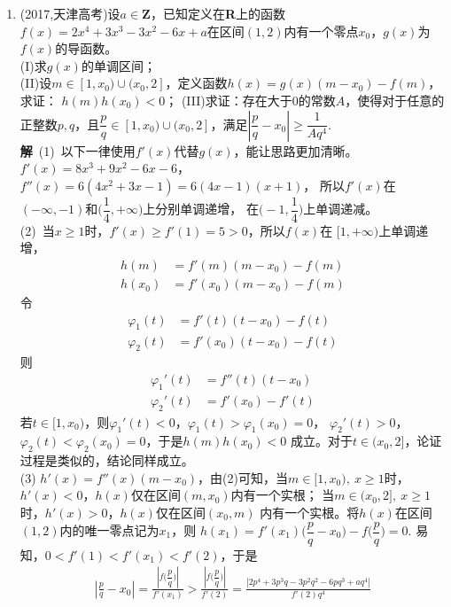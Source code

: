 \begin{enumerate}[label={【\textbf{例\thechapter.\arabic*}】},
 leftmargin=\inteval{\myenumleftmargin}pt,
 itemsep=\inteval{\myenumitempsep}pt,
 itemindent=\inteval{\myenumitemindent}pt]
\item (2017,天津高考)设$ a\in \textbf{Z} $，已知定义在\textbf{R}上的函数$ f(x)=2x^4+3x^3
-3x^2-6x+a $在区间$ (1,2) $内有一个零点$ x_0 $，$ g(x) $为$ f(x) $的导函数。\\
(I)求$ g(x) $的单调区间；\\
(II)设$ m\in [1,x_0)\cup(x_0,2] $，定义函数$ h(x)=g(x)(m-x_0)-f(m) $，求证：
$ h(m)h(x_0)<0 $；
(III)求证：存在大于0的常数$ A $，使得对于任意的正整数$ p,q $，且$ \dfrac{p}{q}\in[1,
x_0)\cup(x_0,2] $，满足$ \left|\dfrac{p}{q}-x_0\right|\geq 
 \dfrac{1}{Aq^4} $. \\
\textbf{解}\ (1)\ 以下一律使用$ f'(x) $代替$ g(x) $，能让思路更加清晰。
$ f'(x)=8x^3+9x^2-6x-6 $，$ f''(x)=6(4x^2+3x-1)=6(4x-1)(x+1) $，
所以$ f'(x) $在$ (-\infty,-1) $和$ \Big(\dfrac{1}{4},+\infty\Big) $上分别单调递增，
在$ \Big(-1,\dfrac{1}{4}\Big) $上单调递减。\\
(2)\ 当$ x\geq 1 $时，$ f'(x)\geq f'(1)=5>0 $，所以$ f(x) $在
$ [1,+\infty) $上单调递增，
\begin{align*}
    h(m)  &=f'(m)(m-x_0)-f(m) \\
    h(x_0)&=f'(x_0)(m-x_0)-f(m) 
\end{align*}
令
\begin{align*}
    \varphi_1(t) &=f'(t)(t-x_0)-f(t) \\
    \varphi_2(t) &=f'(x_0)(t-x_0)-f(t) 
\end{align*}
则
\begin{align*}
    \varphi_1'(t) &=f''(t)(t-x_0) \\
    \varphi_2'(t) &=f'(x_0)-f'(t) 
\end{align*}
若$ t\in[1,x_0) $，则$ \varphi_1'(t)<0 $，$ \varphi_1(t)>\varphi_1(x_0)=0 $，
$ \varphi_2'(t)>0 $，$ \varphi_2(t)<\varphi_2(x_0)=0 $，于是$ h(m)h(x_0)<0 $
成立。对于$ t\in(x_0,2] $，论证过程是类似的，结论同样成立。\\
(3) $ h'(x)=f''(x)(m-x_0) $，由(2)可知，当$ m\in[1,x_0),\ x\geq 1 $时，
$ h'(x)<0 $，$ h(x) $仅在区间$ (m,x_0) $内有一个实根；
当$ m\in(x_0,2],\ x\geq 1 $时，$ h'(x)>0 $，$ h(x) $仅在区间$ (x_0,m) $
内有一个实根。将$ h(x) $在区间$ (1,2) $内的唯一零点记为$ x_1 $，则
$ h(x_1)=f'(x_1)\Big(\dfrac{p}{q}-x_0\Big)-f\Big(\dfrac{p}{q}\Big)=0 $.
易知，$ 0<f'(1)<f'(x_1)<f'(2) $，于是
\begin{gather*}
    \left|\frac{p}{q}-x_0\right|=\frac{\left|f\Big(\dfrac{p}{q}\Big)
        \right|}{f'(x_1)}>\frac{\left|f\Big(\dfrac{p}{q}\Big)\right|}{f'(2)}
    =\frac{\left|2p^4+3p^3q-3p^2q^2-6pq^3+aq^4\right|}{f'(2)q^4}
\end{gather*}

\end{enumerate}
